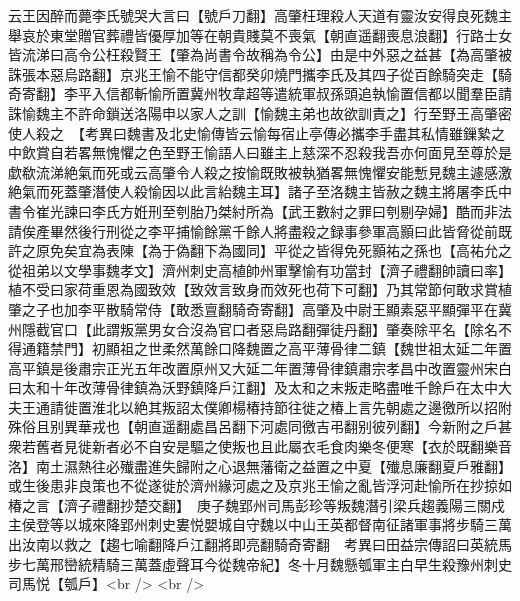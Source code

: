 云王因醉而薨李氏號哭大言曰【號戶刀翻】高肇枉理殺人天道有靈汝安得良死魏主舉哀於東堂贈官葬禮皆優厚加等在朝貴賤莫不喪氣【朝直遥翻喪息浪翻】行路士女皆流涕曰高令公枉殺賢王【肇為尚書令故稱為令公】由是中外惡之益甚【為高肇被誅張本惡烏路翻】京兆王愉不能守信都癸卯燒門攜李氏及其四子從百餘騎突走【騎奇寄翻】李平入信都斬愉所置冀州牧韋超等遣統軍叔孫頭追執愉置信都以聞羣臣請誅愉魏主不許命鎖送洛陽申以家人之訓【愉魏主弟也故欲訓責之】行至野王高肇密使人殺之　【考異曰魏書及北史愉傳皆云愉每宿止亭傳必攜李手盡其私情雖鏁縶之中飲賞自若畧無愧懼之色至野王愉語人曰雖主上慈深不忍殺我吾亦何面見至尊於是歔欷流涕絶氣而死或云高肇令人殺之按愉既敗被執猶畧無愧懼安能慙見魏主遽感激絶氣而死蓋肇潛使人殺愉因以此言紿魏主耳】諸子至洛魏主皆赦之魏主將屠李氏中書令崔光諫曰李氏方姙刑至刳胎乃桀紂所為【武王數紂之罪曰刳剔孕婦】酷而非法請俟產畢然後行刑從之李平捕愉餘黨千餘人將盡殺之録事參軍高顥曰此皆脅從前既許之原免矣宜為表陳【為于偽翻下為國同】平從之皆得免死顥祐之孫也【高祐允之從祖弟以文學事魏孝文】濟州刺史高植帥州軍擊愉有功當封【濟子禮翻帥讀曰率】植不受曰家荷重恩為國致效【致效言致身而效死也荷下可翻】乃其常節何敢求賞植肇之子也加李平散騎常侍【敢悉亶翻騎奇寄翻】高肇及中尉王顯素惡平顯彈平在冀州隱截官口【此謂叛黨男女合沒為官口者惡烏路翻彈徒丹翻】肇奏除平名【除名不得通籍禁門】初顯祖之世柔然萬餘口降魏置之高平薄骨律二鎮【魏世祖太延二年置高平鎮是後肅宗正光五年改置原州又大延二年置薄骨律鎮肅宗孝昌中改置靈州宋白曰太和十年改薄骨律鎮為沃野鎮降戶江翻】及太和之末叛走略盡唯千餘戶在太中大夫王通請徙置淮北以絶其叛詔太僕卿楊椿持節往徙之椿上言先朝處之邊徼所以招附殊俗且别異華戎也【朝直遥翻處昌呂翻下河處同徼吉弔翻别彼列翻】今新附之戶甚衆若舊者見徙新者必不自安是驅之使叛也且此屬衣毛食肉樂冬便寒【衣於既翻樂音洛】南土濕熱往必殱盡進失歸附之心退無藩衛之益置之中夏【殱息廉翻夏戶雅翻】或生後患非良策也不從遂徙於濟州緣河處之及京兆王愉之亂皆浮河赴愉所在抄掠如椿之言【濟子禮翻抄楚交翻】　庚子魏郢州司馬彭珍等叛魏潛引梁兵趨義陽三關戍主侯登等以城來降郢州刺史婁悦嬰城自守魏以中山王英都督南征諸軍事將步騎三萬出汝南以救之【趨七喻翻降戶江翻將即亮翻騎奇寄翻　考異曰田益宗傳詔曰英統馬步七萬邢巒統精騎三萬蓋虛聲耳今從魏帝紀】冬十月魏懸瓠軍主白早生殺豫州刺史司馬悦【瓠戶】<br />
<br />
